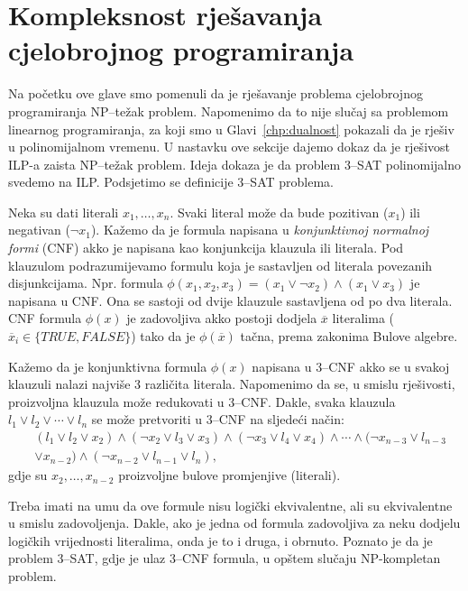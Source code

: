\documentclass[b5paper, utf8, 11pt, colorlinks]{book}
\theoremstyle{definition}
\begin{document}
\section{Kompleksnost rješavanja cjelobrojnog programiranja}\label{sec:kompleksnostILP}

Na početku ove glave smo pomenuli da je rješavanje problema cjelobrojnog programiranja NP--težak problem. Napomenimo da to nije slučaj sa problemom linearnog programiranja, za koji smo u Glavi~\ref{chp:dualnost} pokazali da je rješiv u polinomijalnom vremenu. U nastavku ove sekcije dajemo dokaz da je rješivost ILP-a zaista NP--težak problem. Ideja dokaza je da problem 3--SAT  polinomijalno svedemo na ILP.
Podsjetimo se definicije 3--SAT problema. 

Neka su dati literali $x_1, \ldots, x_n$. Svaki literal može da bude pozitivan ($x_1$) ili negativan  ($\neg x_1$). Kažemo da je formula napisana u \emph{konjunktivnoj normalnoj formi} (CNF) akko je napisana kao konjunkcija klauzula ili literala. Pod klauzulom podrazumijevamo formulu koja je sastavljen  od literala povezanih disjunkcijama. Npr. formula $\phi(x_1, x_2, x_3)= (x_1 \vee  \neg x_2) \wedge (x_1 \vee x_3)$ je napisana u CNF. Ona se sastoji od dvije klauzule sastavljena od po dva literala. CNF formula $\phi(x)$ je zadovoljiva akko postoji dodjela $\overline{x}$ literalima ($\overline{x}_i \in \{TRUE, FALSE\}$) tako da je $\phi(\overline{x})$ tačna, prema zakonima Bulove algebre.  


Kažemo da je konjunktivna formula $\phi(x)$  napisana u 3--CNF  akko se u svakoj klauzuli nalazi najviše 3 različita literala. Napomenimo da se, u smislu rješivosti, proizvoljna klauzula može redukovati u 3--CNF. Dakle, svaka klauzula 
$l_1 \vee l_2 \vee \cdots \vee l_n$ se može pretvoriti u 3--CNF na sljedeći način:
\begin{align*}
	&(l_1 \vee l_2 \vee x_2) \wedge ( \neg x_2 \vee l_3 \vee x_3) \wedge ( \neg x_3 \vee l_4 \vee x_4 ) \wedge \cdots \wedge (\neg x_{n-3} \vee l_{n-3} \\
	&\vee x_{n-2} ) \wedge ( \neg x_{n-2} \vee l_{n-1} \vee l_n ),  
\end{align*}    
gdje su $x_2, \ldots, x_{n-2}$  proizvoljne bulove promjenjive (literali).  

Treba imati na umu da ove formule nisu logički ekvivalentne, ali su ekvivalentne u smislu zadovoljenja. Dakle, ako je jedna od formula zadovoljiva za neku dodjelu logičkih vrijednosti literalima, onda je to i druga, i obrnuto. 
Poznato je da je problem 3--SAT, gdje je ulaz 3--CNF formula,  u opštem slučaju NP-kompletan problem.  
\end{document}
